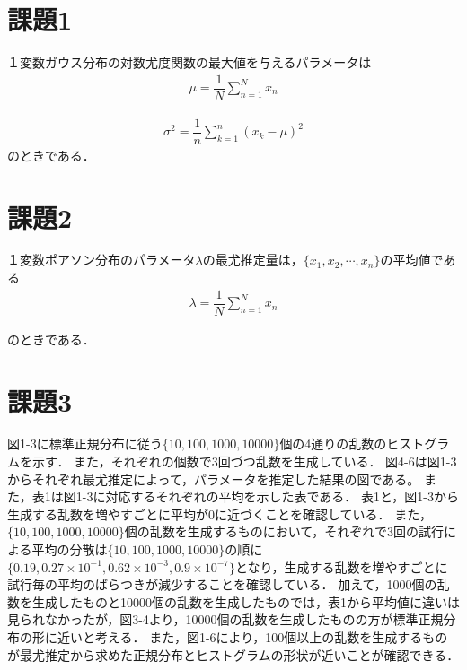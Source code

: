 \documentclass[twocolumn]{jarticle}
\title{
\jtitle{知的学習システム第2回レポート}
}
\author{%
\jname{1930099 服部 凌典}
}
\begin{document}
\maketitle


\section{課題1}
１変数ガウス分布の対数尤度関数の最大値を与えるパラメータは
\begin{eqnarray}
\mu=\dfrac{1}{N} \displaystyle\sum_{n=1}^{N}x_n\end{eqnarray}

\begin{eqnarray}
\sigma^2=\dfrac{1}{n}\displaystyle\sum_{k=1}^n(x_k-\mu)^2
\end{eqnarray}
のときである．

\section{課題2}
１変数ポアソン分布のパラメータ$\lambda$の最尤推定量は，$\{x_1, x_2, \cdots, x_n\}$の平均値である
\begin{eqnarray}
\lambda =\dfrac{1}{N} \displaystyle\sum_{n=1}^{N}x_n
\end{eqnarray}

のときである．

\section{課題3}
図1-3に標準正規分布に従う$\{10, 100, 1000, 10000\}$個の4通りの乱数のヒストグラムを示す．
また，それぞれの個数で3回づつ乱数を生成している．
図4-6は図1-3からそれぞれ最尤推定によって，パラメータを推定した結果の図である。
また，表1は図1-3に対応するそれぞれの平均を示した表である．
表1と，図1-3から生成する乱数を増やすごとに平均が$0$に近づくことを確認している．
また，$\{10, 100, 1000, 10000\}$個の乱数を生成するものにおいて，それぞれで3回の試行による平均の分散は$\{10, 100, 1000, 10000\}$の順に$\{0.19, 0.27\times 10^{-1}, 0.62\times 10^{-3}, 0.9 \times 10^{-7}\}$となり，生成する乱数を増やすごとに試行毎の平均のばらつきが減少することを確認している．
加えて，1000個の乱数を生成したものと10000個の乱数を生成したものでは，表1から平均値に違いは見られなかったが，図3-4より，10000個の乱数を生成したものの方が標準正規分布の形に近いと考える．
また，図1-6により，100個以上の乱数を生成するものが最尤推定から求めた正規分布とヒストグラムの形状が近いことが確認できる．




\end{document}
